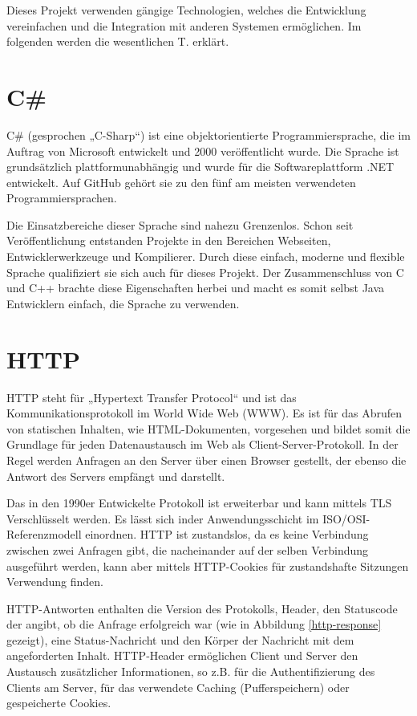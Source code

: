 Dieses Projekt verwenden gängige Technologien, welches die Entwicklung vereinfachen und die Integration mit anderen Systemen ermöglichen. Im folgenden werden die wesentlichen T. erklärt.

\section{C\#}
C\# (gesprochen „C-Sharp“) ist eine objektorientierte Programmiersprache, die im Auftrag von Microsoft entwickelt und 2000 veröffentlicht wurde.
Die Sprache ist grundsätzlich plattformunabhängig und wurde für die Softwareplattform .NET entwickelt.
Auf GitHub gehört sie zu den fünf am meisten verwendeten Programmiersprachen.\cite{ms-csharp}

Die Einsatzbereiche dieser Sprache sind nahezu Grenzenlos.
Schon seit Veröffentlichung entstanden Projekte in den Bereichen Webseiten, Entwicklerwerkzeuge und Kompilierer.
Durch diese einfach, moderne und flexible Sprache qualifiziert sie sich auch für dieses Projekt.
Der Zusammenschluss von C und C++ brachte diese Eigenschaften herbei und macht es somit selbst Java Entwicklern einfach, die Sprache zu verwenden.\cite{dev-csharp}

\section{HTTP}
HTTP steht für „Hypertext Transfer Protocol“ und ist das Kommunikationsprotokoll im World Wide Web (WWW).
Es ist für das Abrufen von statischen Inhalten, wie HTML-Dokumenten, vorgesehen und bildet somit die Grundlage für jeden Datenaustausch im Web als Client-Server-Protokoll.
In der Regel werden Anfragen an den Server über einen Browser gestellt, der ebenso die Antwort des Servers empfängt und darstellt.

Das  in den 1990er Entwickelte Protokoll ist erweiterbar und kann mittels TLS Verschlüsselt werden. Es lässt sich inder Anwendungsschicht im ISO/OSI-Referenzmodell einordnen.
HTTP ist zustandslos, da es keine Verbindung zwischen zwei Anfragen gibt, die nacheinander auf der selben Verbindung ausgeführt werden, kann aber mittels HTTP-Cookies für zustandshafte Sitzungen Verwendung finden.\cite{mdn-http}

HTTP-Antworten enthalten die Version des Protokolls, Header, den Statuscode der angibt, ob die Anfrage erfolgreich war (wie in Abbildung \vref{http-response} gezeigt), eine Status-Nachricht und den Körper der Nachricht mit dem angeforderten Inhalt.
HTTP-Header ermöglichen Client und Server den Austausch zusätzlicher Informationen, so z.B. für die Authentifizierung des Clients am Server, für das verwendete Caching (Pufferspeichern) oder gespeicherte Cookies.\cite{mdn-http-header}

